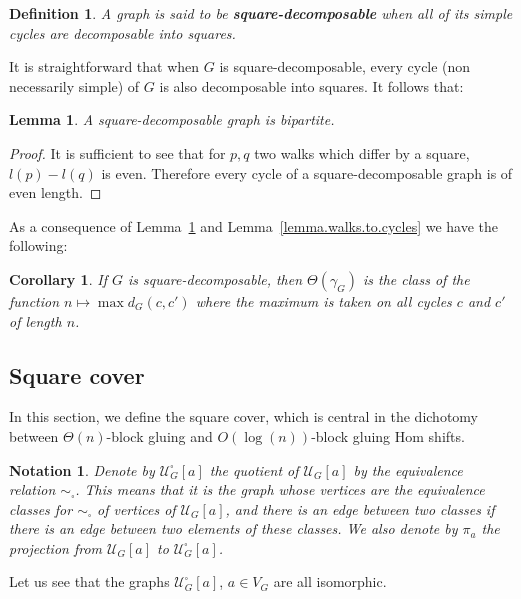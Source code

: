 \documentclass{article}
\newtheorem{lemma}[theorem]{Lemma}
\newtheorem{corollary}[theorem]{Corollary}
\newtheorem{definition}[theorem]{Definition}
\newtheorem{notation}[theorem]{Notation}
\newcommand\quadcover[1]{\mathcal{U}^\square_{#1}}
\begin{document}
\begin{definition}
A graph is said to be \textbf{square-decomposable} when all of its simple cycles are decomposable into squares.
\end{definition}

It is straightforward that when $G$ is square-decomposable, every cycle (non necessarily simple) of $G$ is also decomposable into squares. It follows that:

\begin{lemma}\label{lemma.even.length}
A square-decomposable graph is bipartite.
\end{lemma}

\begin{proof}
It is sufficient to see that for $p,q$ two walks which differ by a square, $l(p)-l(q)$ is even. Therefore every cycle of a square-decomposable graph is of even length.
\end{proof}

As a consequence of Lemma~\ref{lemma.even.length} and Lemma~\ref{lemma.walks.to.cycles} we have the following: 

\begin{corollary}
If $G$ is square-decomposable, then $\Theta(\gamma_G)$ is the class of the function $n\mapsto\max d_G(c,c')$ where the maximum is taken on all cycles $c$ and $c'$ of length $n$.
\end{corollary}


\subsection{Square cover\label{sec:sqcover}}

In this section, we define the square cover, which is central in the dichotomy between $\Theta(n)$-block gluing and $O(\log(n))$-block gluing Hom shifts. 


\begin{notation}
Denote by $\quadcover{G}[a]$ the quotient of $\mathcal{U}_G[a]$ by the equivalence relation $\sim_{\square}$. This means that it is the graph 
whose vertices are the equivalence classes for $\sim_{\square}$ of vertices of $\mathcal{U}_G[a]$,
and there is an edge between two classes if there is an edge between two elements of these classes. We also denote by $\pi_a$ the projection from $\mathcal{U}_G[a]$ to  $\quadcover{G}[a]$.
\end{notation}

Let us see that the graphs $\quadcover{G}[a]$, $a \in V_G$ are all isomorphic.
\end{document}
